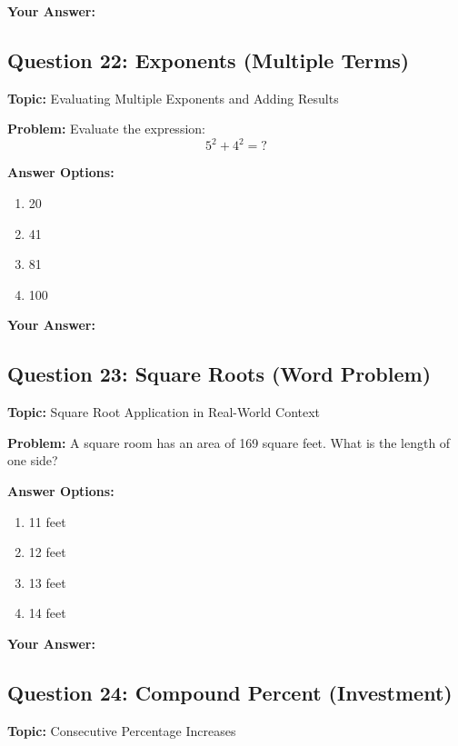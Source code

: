 \documentclass[12pt]{article}
\begin{document}
\noindent\textbf{Your Answer:} \underline{\hspace{2cm}}

\vspace{0.5cm}


\subsection{Question 22: Exponents (Multiple Terms)}
\textbf{Topic:} Evaluating Multiple Exponents and Adding Results

\textbf{Problem:} Evaluate the expression:
\[5^2 + 4^2 = ?\]

\textbf{Answer Options:}
\begin{enumerate}[label=\Alph*)]
    \item 20
    \item 41
    \item 81
    \item 100
\end{enumerate}

\noindent\textbf{Your Answer:} \underline{\hspace{2cm}}

\vspace{0.5cm}


\subsection{Question 23: Square Roots (Word Problem)}
\textbf{Topic:} Square Root Application in Real-World Context

\textbf{Problem:} A square room has an area of 169 square feet. What is the length of one side?

\textbf{Answer Options:}
\begin{enumerate}[label=\Alph*)]
    \item 11 feet
    \item 12 feet
    \item 13 feet
    \item 14 feet
\end{enumerate}

\noindent\textbf{Your Answer:} \underline{\hspace{2cm}}

\vspace{0.5cm}


\subsection{Question 24: Compound Percent (Investment)}
\textbf{Topic:} Consecutive Percentage Increases
\end{document}
